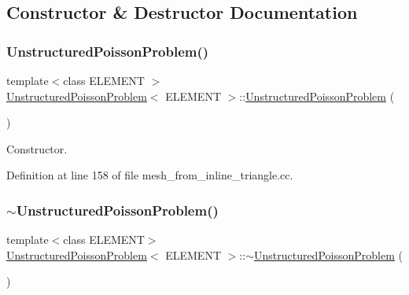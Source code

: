 \subsection{Constructor \& Destructor Documentation}
\mbox{\label{classUnstructuredPoissonProblem_a26e7610a714aea17c9278beec4842371}} 
\subsubsection{\texorpdfstring{Unstructured\+Poisson\+Problem()}{UnstructuredPoissonProblem()}\hspace{0.1cm}{\footnotesize\ttfamily [1/2]}}
{\footnotesize\ttfamily template$<$class E\+L\+E\+M\+E\+NT $>$ \\
\hyperlink{classUnstructuredPoissonProblem}{Unstructured\+Poisson\+Problem}$<$ E\+L\+E\+M\+E\+NT $>$\+::\hyperlink{classUnstructuredPoissonProblem}{Unstructured\+Poisson\+Problem} (\begin{DoxyParamCaption}{ }\end{DoxyParamCaption})}



Constructor. 



Definition at line 158 of file mesh\+\_\+from\+\_\+inline\+\_\+triangle.\+cc.

\mbox{\label{classUnstructuredPoissonProblem_aeae85592e36ba7be6b4891fb49d2197b}} 
\subsubsection{\texorpdfstring{$\sim$\+Unstructured\+Poisson\+Problem()}{~UnstructuredPoissonProblem()}\hspace{0.1cm}{\footnotesize\ttfamily [1/2]}}
{\footnotesize\ttfamily template$<$class E\+L\+E\+M\+E\+NT$>$ \\
\hyperlink{classUnstructuredPoissonProblem}{Unstructured\+Poisson\+Problem}$<$ E\+L\+E\+M\+E\+NT $>$\+::$\sim$\hyperlink{classUnstructuredPoissonProblem}{Unstructured\+Poisson\+Problem} (\begin{DoxyParamCaption}{ }\end{DoxyParamCaption})\hspace{0.3cm}{\ttfamily [inline]}}



